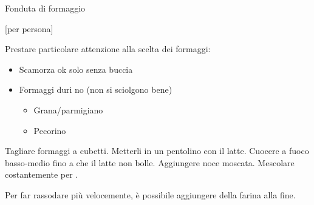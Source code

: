 \begin{recipe}{Fonduta di formaggio}
    \begin{header}
        [per persona]
    
    \end{header}
    
    \begin{introduction}
        Prestare particolare attenzione alla scelta dei formaggi:
        
        \begin{itemize}
            \item Scamorza ok solo senza buccia
            \item Formaggi duri no (non si sciolgono bene)
                \begin{itemize}
                    \item Grana/parmigiano
                    \item Pecorino
                \end{itemize}
        \end{itemize}
    \end{introduction}
    
    \begin{ingredients}
    \end{ingredients}
    
    \begin{preparation}
        \step Tagliare formaggi a cubetti.
        \step Metterli in un pentolino con il latte.
        \step Cuocere a fuoco basso-medio fino a che il latte non bolle.
        \step Aggiungere noce moscata.
        \step Mescolare costantemente per .
    \end{preparation}
    
    \begin{suggestion}
        \suggestionMark Per far rassodare più velocemente, è possibile aggiungere della farina alla fine.
    \end{suggestion}
\end{recipe}
